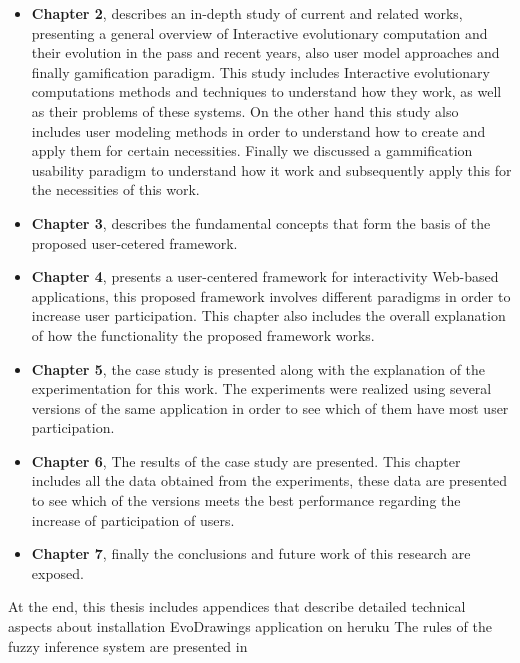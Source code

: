 \begin{itemize}
\item \textbf{Chapter 2}, describes an in-depth study of current and related
works, presenting a general overview of Interactive evolutionary computation and
their evolution in the pass and recent years, also user model approaches and
finally gamification paradigm. This study includes Interactive evolutionary
computations methods and techniques to understand how they work, as well as
their problems of these systems. On the other hand this study also includes user
modeling methods in order to understand how to create and apply them for certain
necessities. Finally we discussed a gammification usability paradigm to
understand how it work and subsequently apply this for the necessities of this
work.

\item \textbf{Chapter 3}, describes the fundamental
concepts that form the basis of the proposed user-cetered framework.

\item \textbf{Chapter 4}, presents a user-centered framework for interactivity
Web-based applications, this proposed framework involves different paradigms in
order to increase user participation. This chapter also includes the overall
explanation of how the functionality the proposed framework works.

\item \textbf{Chapter 5}, the case study is presented along with the
explanation of the experimentation for this work. The experiments were realized
using several versions of the same application in order to see which of them
have most user participation.

\item \textbf{Chapter 6}, The results of the case study are presented. This
chapter includes all the data obtained from the experiments, these data are
presented to see which of the versions meets the best performance regarding the
increase of participation of users.

\item \textbf{Chapter 7}, finally the conclusions and future work of this
research are exposed.
\end{itemize}

At the end, this thesis includes appendices that describe
detailed technical aspects about installation EvoDrawings application on heruku
The rules of the fuzzy inference system are presented in  %

